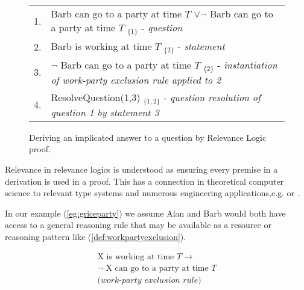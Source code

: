 \documentclass[11pt,a4paper]{article}
\theoremstyle{definition}
\begin{document}
\begin{figure*}[!t]
    \centering
    \begin{tabular}{ll}
         1. & Barb can go to a party at time $T$ $\lor \neg$ Barb can go to a party at time $T$ $_{\{1\}}$ - \textit{question} \\
         2. & Barb is working at time $T$ $_{\{2\}}$ - \textit{statement} \\
         \hline
         3. & $\neg$ Barb can go to a party at time $T$ $_{\{2\}}$ - \textit{instantiation of work-party exclusion rule applied to 2} \\

        4. & ResolveQuestion(1,3) $_{\{1,2\}}$ - \textit{question resolution of question 1 by statement 3}
         
    \end{tabular}
    \caption{Deriving an implicated answer to a question by Relevance Logic proof.}
    \label{fig-relevancelogic}
\end{figure*}





Relevance in relevance logics is understood as ensuring every premise in a derivation is used in a proof. This has a connection in theoretical computer science to relevant type systems \cite{walker2005substructural} and numerous engineering applications,e.g. \cite{cheng2004temporal} or \cite{Bruns:2011:ACV:1952982.1952991}. %

In our example (\ref{eg:griceparty}) we assume Alan and Barb would both have access to a general reasoning rule that may be available as a resource or reasoning pattern like (\ref{def:workpartyexclusion}).

\vspace*{-0.5cm}
\begin{align}
    \label{def:workpartyexclusion}  \text{X is working at time }T \rightarrow \nonumber \\
    \neg\text{ X can go to a party at time }T\nonumber \\
    \textit{(work-party exclusion rule)}
\end{align}
\vspace*{-0.5cm}
\end{document}
